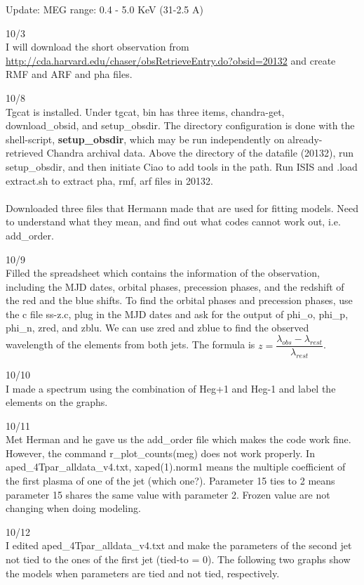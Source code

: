 Update: MEG range: 0.4 - 5.0 KeV (31-2.5 A)

10/3\\
I will download the short observation from 
\url{http://cda.harvard.edu/chaser/obsRetrieveEntry.do?obsid=20132} and create RMF and ARF and pha files. 




10/8\\
Tgcat is installed. Under tgcat, bin has three items, chandra-get, download\_obsid, and setup\_obsdir. The directory configuration is done with the shell-script, \textbf{setup\_obsdir}, which may be run independently on already-retrieved Chandra archival data.
Above the directory of the datafile (20132), run setup\_obsdir, and then initiate Ciao to add tools in the path. Run ISIS and .load extract.sh to extract pha, rmf, arf files in 20132.\\\\
Downloaded three files that Hermann made that are used for fitting models. Need to understand what they mean, and find out what codes cannot work out, i.e. add\_order.


10/9\\
Filled the spreadsheet which contains the information of the observation, including the MJD dates, orbital phases, precession phases, and the redshift of the red and the blue shifts.
To find the orbital phases and precession phases, use the c file ss-z.c, plug in the MJD dates and ask for the output of  phi\_o, phi\_p, phi\_n, zred, and zblu. 
We can use zred and zblue to find the observed wavelength of the elements from both jets. The formula is $z = \dfrac{\lambda_{obs} - \lambda_{rest}}{\lambda_{rest}}$.

10/10\\
I made a spectrum using the combination of Heg+1 and Heg-1 and label the elements on the graphs. 

10/11\\
Met Herman and he gave us the add\_order file which makes the code work fine. However, the command r\_plot\_counts(meg) does not work properly. 
In aped\_4Tpar\_alldata\_v4.txt, xaped(1).norm1 means the multiple coefficient of the first plasma of one of the jet (which one?). Parameter 15 ties to 2 means parameter 15 shares the same value with parameter 2. Frozen value are not changing when doing modeling. 

10/12\\
I edited aped\_4Tpar\_alldata\_v4.txt and make the parameters of the second jet not tied to the ones of the first jet (tied-to = 0). The following two graphs show the models when parameters are tied and not tied, respectively.

